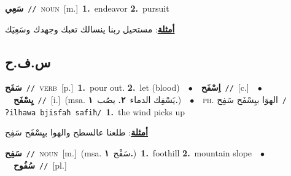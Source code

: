 \documentclass[10pt,a4paper,twoside]{article} %
\begin{document}
\begin{multicols}{2}
{\setlength\topsep{0pt}\textbf{\foreignlanguage{arabic}{سَعِي}}\ {\color{gray}\texttt{//}\color{black}}\ \textsc{noun}\ [m.]\ \textbf{1.}~endeavor  \textbf{2.}~pursuit\  \begin{flushright}\color{gray}\foreignlanguage{arabic}{\textbf{\underline{\foreignlanguage{arabic}{أمثلة}}}: مستحيل ربنا ينسالك تعبك وجهدك وسَعِيَك}\end{flushright}\color{black}} \vspace{2mm}

\vspace{-3mm}
\subsection*{\color{blue}\foreignlanguage{arabic}{س.ف.ح}\color{blue}{}} 

{\setlength\topsep{0pt}\textbf{\foreignlanguage{arabic}{سَفَح}}\ {\color{gray}\texttt{//}\color{black}}\ \textsc{verb}\ [p.]\ \textbf{1.}~pour out.  \textbf{2.}~let (blood)\ \ $\bullet$\ \ \setlength\topsep{0pt}\textbf{\foreignlanguage{arabic}{اِسْفَح}}\ {\color{gray}\texttt{//}\color{black}}\ [c.]\ \ $\bullet$\ \ \setlength\topsep{0pt}\textbf{\foreignlanguage{arabic}{يِسْفَح}}\ {\color{gray}\texttt{//}\color{black}}\ [i.]\ \color{gray}(msa. \foreignlanguage{arabic}{يَسْفِك الدماء}~\foreignlanguage{arabic}{\textbf{٢.}}  \foreignlanguage{arabic}{يصُب}~\foreignlanguage{arabic}{\textbf{١.}})\color{black}\ \ $\bullet$\ \ \textsc{ph.} \color{gray} \foreignlanguage{arabic}{الهوَا بيِسْفَح سَفِح}\color{black}\ {\color{gray}\texttt{/{\sffamily ʔilhawa bjisfaħ safiħ}/}\color{black}}\ \textbf{1.}~the wind picks up\  \begin{flushright}\color{gray}\foreignlanguage{arabic}{\textbf{\underline{\foreignlanguage{arabic}{أمثلة}}}: طلعنا عالسطح والهوا بيِسْفَح سَفِح}\end{flushright}\color{black}} \vspace{2mm}

{\setlength\topsep{0pt}\textbf{\foreignlanguage{arabic}{سَفِح}}\ {\color{gray}\texttt{//}\color{black}}\ \textsc{noun}\ [m.]\ \color{gray}(msa. \foreignlanguage{arabic}{سَفْح}~\foreignlanguage{arabic}{\textbf{١.}})\color{black}\ \textbf{1.}~foothill  \textbf{2.}~mountain slope\ \ $\bullet$\ \ \setlength\topsep{0pt}\textbf{\foreignlanguage{arabic}{سُفُوح}}\ {\color{gray}\texttt{//}\color{black}}\ [pl.]\ } \vspace{2mm}


\end{multicols}
\end{document}
